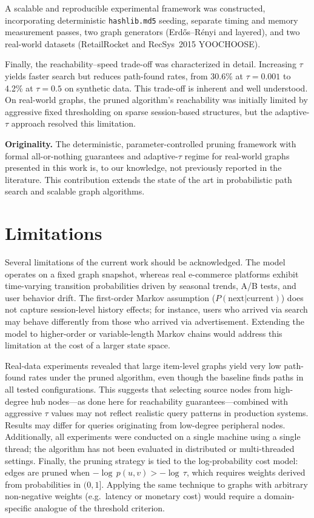 A scalable and reproducible experimental framework was constructed, incorporating deterministic \texttt{hashlib.md5} seeding, separate timing and memory measurement passes, two graph generators (Erd\H{o}s--R\'{e}nyi and layered), and two real-world datasets (RetailRocket and RecSys~2015 YOOCHOOSE).


Finally, the reachability--speed trade-off was characterized in detail. Increasing $\tau$ yields faster search but reduces path-found rates, from 30.6\% at $\tau=0.001$ to 4.2\% at $\tau=0.5$ on synthetic data. This trade-off is inherent and well understood. On real-world graphs, the pruned algorithm's reachability was initially limited by aggressive fixed thresholding on sparse session-based structures, but the adaptive-$\tau$ approach resolved this limitation.

\medskip
\noindent\textbf{Originality.} The deterministic, parameter-controlled pruning framework with formal all-or-nothing guarantees and adaptive-$\tau$ regime for real-world graphs presented in this work is, to our knowledge, not previously reported in the literature. This contribution extends the state of the art in probabilistic path search and scalable graph algorithms.

\section{Limitations}

Several limitations of the current work should be acknowledged. The model operates on a fixed graph snapshot, whereas real e-commerce platforms exhibit time-varying transition probabilities driven by seasonal trends, A/B tests, and user behavior drift. The first-order Markov assumption ($P(\text{next}|\text{current})$) does not capture session-level history effects; for instance, users who arrived via search may behave differently from those who arrived via advertisement. Extending the model to higher-order or variable-length Markov chains would address this limitation at the cost of a larger state space.

Real-data experiments revealed that large item-level graphs yield very low path-found rates under the pruned algorithm, even though the baseline finds paths in all tested configurations. This suggests that selecting source nodes from high-degree hub nodes---as done here for reachability guarantees---combined with aggressive $\tau$ values may not reflect realistic query patterns in production systems. Results may differ for queries originating from low-degree peripheral nodes. Additionally, all experiments were conducted on a single machine using a single thread; the algorithm has not been evaluated in distributed or multi-threaded settings. Finally, the pruning strategy is tied to the log-probability cost model: edges are pruned when $-\log\,p(u,v) > -\log\,\tau$, which requires weights derived from probabilities in $(0,1]$. Applying the same technique to graphs with arbitrary non-negative weights (e.g.\ latency or monetary cost) would require a domain-specific analogue of the threshold criterion.

